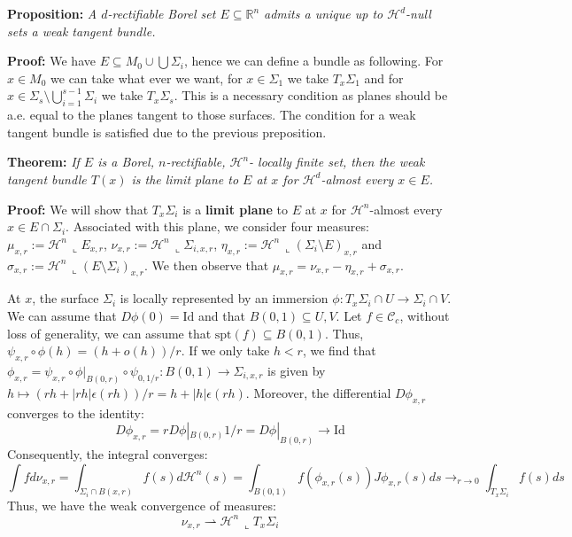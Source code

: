 \vspace{2ex}
\textbf{Proposition:} \textit{A $d$-rectifiable Borel set $E\subseteq\mathbb R^n$
admits a unique up to $\mathcal H^d$-null sets a weak tangent bundle.}

\vspace{1ex}
\textbf{Proof:} We have $E\subseteq M_0\cup\bigcup\Sigma_i$, hence we can define
a bundle as following. For $x\in M_0$ we can take what ever we want, for $x\in
\Sigma_1$ we take $T_x\Sigma_1$ and for $x\in \Sigma_s\setminus\bigcup_{i=1}^{s
-1}\Sigma_i$ we take $T_x\Sigma_s$. This is a necessary condition as planes
should be a.e. equal to the planes tangent to those surfaces. The condition for
a weak tangent bundle is satisfied due to the previous preposition.

\vspace{2ex}
\textbf{Theorem:} \textit{If $E$ is a Borel, $n$-rectifiable, $\mathcal{H}^n$-
locally finite set, then the weak tangent bundle $T(x)$ is the limit plane to
$E$ at $x$ for $\mathcal{H}^d$-almost every $x\in E$.}

\vspace{1ex}
\textbf{Proof:}
We will show that $T_x\Sigma_i$ is a \textbf{limit plane} to $E$ at $x$ for
$\mathcal H^n$-almost every $x\in E\cap\Sigma_i$. Associated with this plane,
we consider four measures: $\mu_{x,r}:=\mathcal H^n\,\llcorner E_{x,r}$,
$\nu_{x,r}:=\mathcal H^n\,\llcorner\Sigma_{i,x,r}$, $\eta_{x,r}:=\mathcal H^n\,
\llcorner (\Sigma_i\setminus E)_{x,r}$ and $\sigma_{x,r}:=\mathcal H^n\,
\llcorner (E\setminus\Sigma_i)_{x,r}$. We then observe that $\mu_{x,r}=\nu_{x,r}
-\eta_{x,r}+\sigma_{x,r}$.

\vspace{1ex}
At $x$, the surface $\Sigma_i$ is locally represented by an immersion $\phi: T_x\Sigma_i \cap U \rightarrow \Sigma_i \cap V$. We can assume that $D\phi(0)=\text{Id}$ and that $B(0,1)\subseteq U,V$. Let $f\in\mathcal C_c$, without loss of generality, we can assume that $\text{spt}(f)\subseteq B(0,1)$. Thus, $\psi_{x,r}\circ \phi(h)=(h+o(h))/r$. If we only take $h<r$, we find that $\phi_{x,r}=\psi_{x,r}\circ \phi|_{B(0,r)}\circ \psi_{0,1/r}:B(0,1) \rightarrow \Sigma_{i,x,r}$ is given by $h\mapsto (rh+|rh|\epsilon(rh))/r=h+|h|\epsilon(rh)$.
Moreover, the differential $D\phi_{x,r}$ converges to the identity:
\[D\phi_{x,r}=rD\phi|_{B(0,r)}1/r=D\phi|_{B(0,r)}\rightarrow \text{Id}\]
Consequently, the integral converges:
\[\int fd\nu_{x,r}=\int_{\Sigma_i\cap B(x,r)}f(s)d\mathcal H^n(s)=\int_{B(0,1)}f(\phi_{x,r}(s)) J\phi_{x,r}(s)ds\rightarrow_{r\rightarrow 0}\int_{T_x\Sigma_i}f(s)ds\]
Thus, we have the weak convergence of measures:
\[\nu_{x,r}\rightharpoonup\mathcal H^n\,\llcorner T_x\Sigma_i\]

